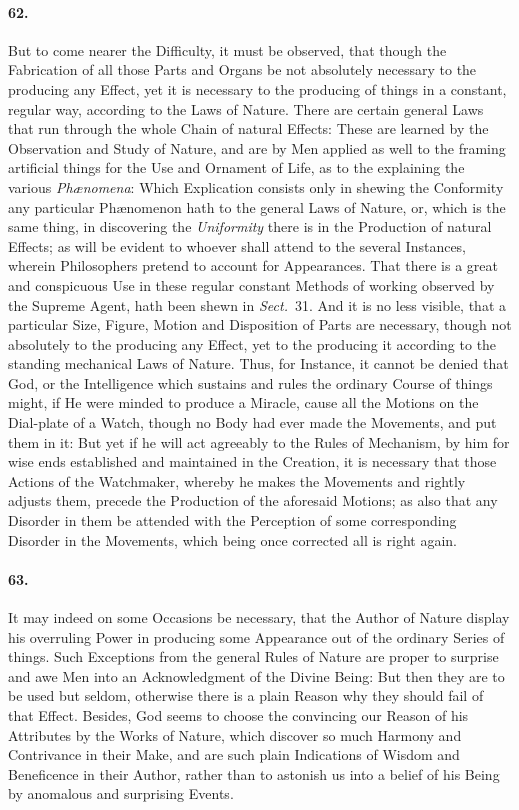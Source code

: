 \documentclass[]{article}
\newenvironment{sectionbody}{\begin{multicols}{2}}{\end{multicols}}
\begin{document}
\begin{sectionbody}
\paragraph{62.} But to come nearer the Difficulty, it must be observed, that
though the Fabrication of all those Parts and Organs be not
absolutely necessary to the producing any Effect, yet it is
necessary to the producing of things in a constant, regular way,
according to the Laws of Nature.  There are certain general Laws
that run through the whole Chain of natural Effects: These are
learned by the Observation and Study of Nature, and are by Men
applied as well to the framing artificial things for the Use and
Ornament of Life, as to the explaining the various
\emph{Ph{\ae}nomena}: Which Explication consists only in
shewing the Conformity any particular Ph{\ae}nomenon hath to
the general Laws of Nature, or, which is the same thing, in
discovering the \emph{Uniformity} there is in the Production of
natural Effects; as will be evident to whoever shall attend to
the several Instances, wherein Philosophers pretend to account
for Appearances.  That there is a great and conspicuous Use in
these regular constant Methods of working observed by the Supreme
Agent, hath been shewn in \emph{Sect.}~31.
And it is no less visible, that a particular Size, Figure, Motion
and Disposition of Parts are necessary, though not absolutely to
the producing any Effect, yet to the producing it according to
the standing mechanical Laws of Nature.  Thus, for Instance, it
cannot be denied that God, or the Intelligence which sustains and
rules the ordinary Course of things might, if He were minded to
produce a Miracle, cause all the Motions on the Dial-plate of a
Watch, though no Body had ever made the Movements, and put them
in it: But yet if he will act agreeably to the Rules of
Mechanism, by him for wise ends established and maintained in the
Creation, it is necessary that those Actions of the Watchmaker,
whereby he makes the Movements and rightly adjusts them, precede
the Production of the aforesaid Motions; as also that any
Disorder in them be attended with the Perception of some
corresponding Disorder in the Movements, which being once
corrected all is right again.



\paragraph{63.} It may indeed on some Occasions be necessary, that the Author of
Nature display his overruling Power in producing some Appearance
out of the ordinary Series of things.  Such Exceptions from the
general Rules of Nature are proper to surprise and awe Men into
an Acknowledgment of the Divine Being: But then they are to be
used but seldom, otherwise there is a plain Reason why they
should fail of that Effect.  Besides, God seems to choose the
convincing our Reason of his Attributes by the Works of Nature,
which discover so much Harmony and Contrivance in their Make, and
are such plain Indications of Wisdom and Beneficence in their
Author, rather than to astonish us into a belief of his Being by
anomalous and surprising Events.




\end{sectionbody}
\end{document}
